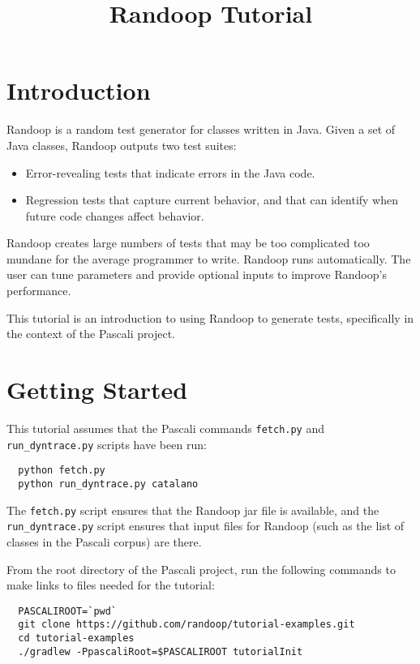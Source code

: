 \documentclass[11pt, oneside]{article} %
\title{Randoop Tutorial}
\newcommand{\cmd}[1]{{\texttt{#1}}}
\begin{document}
\maketitle

\section{Introduction}
Randoop is a random test generator for classes written in Java.
Given a set of Java classes, Randoop outputs two test suites:
\begin{itemize}
\item Error-revealing tests that indicate errors in the Java code.
\item Regression tests that capture current behavior, and that can identify
  when future code changes affect behavior.
\end{itemize}
Randoop creates large numbers of tests that may be too complicated too
mundane for the average programmer to write.
Randoop runs automatically.  The user can tune parameters and provide
optional inputs to improve Randoop's performance.

This tutorial is an introduction to using Randoop to generate tests, specifically in the context of the Pascali project.

\section{Getting Started}
This tutorial assumes that the Pascali commands \cmd{fetch.py} and \cmd{run\_dyntrace.py}
scripts have been run:
\begin{verbatim}
  python fetch.py
  python run_dyntrace.py catalano
\end{verbatim}
The \cmd{fetch.py} script ensures that the Randoop jar file is available,
and the \cmd{run\_dyntrace.py} script ensures that input files for Randoop (such as
the list of classes in the Pascali corpus) are there.

From the root directory of the Pascali project, run the
following commands to make links to files needed for the tutorial:
\begin{verbatim}
  PASCALIROOT=`pwd`
  git clone https://github.com/randoop/tutorial-examples.git
  cd tutorial-examples
  ./gradlew -PpascaliRoot=$PASCALIROOT tutorialInit 
\end{verbatim}
\end{document}
